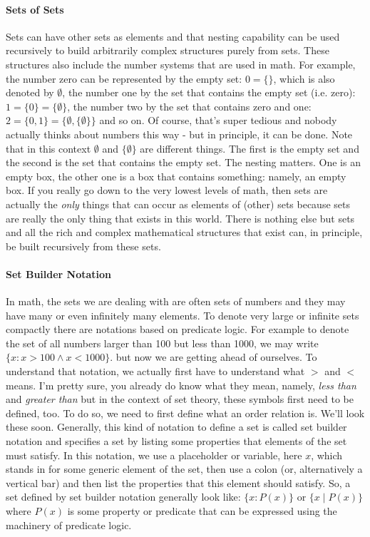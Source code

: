 \paragraph{Sets of Sets}
Sets can have other sets as elements and that nesting capability can be used recursively to build arbitrarily complex structures purely from sets. These structures also include the number systems that are used in math. For example, the number zero can be represented by the empty set: $0 = \{\}$, which is also denoted by $\emptyset$, the number one by the set that contains the empty set (i.e. zero): $1 = \{ 0 \} =  \{ \emptyset \}$, the number two by the set that contains zero and one: $2 = \{ 0, 1 \} = \{ \emptyset, \{ \emptyset \} \}$ and so on. Of course, that's super tedious and nobody actually thinks about numbers this way - but in principle, it can be done. Note that in this context $\emptyset$ and $\{ \emptyset \}$ are different things. The first is the empty set and the second is the set that contains the empty set. The nesting matters. One is an empty box, the other one is a box that contains something: namely, an empty box. If you really go down to the very lowest levels of math, then sets are actually the \emph{only} things that can occur as elements of (other) sets because sets are really the only thing that exists in this world. There is nothing else but sets and all the rich and complex mathematical structures that exist can, in principle, be built recursively from these sets. 

\paragraph{Set Builder Notation}
In math, the sets we are dealing with are often sets of numbers and they may have many or even infinitely many elements. To denote very large or infinite sets compactly there are notations based on predicate logic. For example to denote the set of all numbers larger than 100 but less than 1000, we may write $\{x : x > 100 \wedge x < 1000\}$. but now we are getting ahead of ourselves. To understand that notation, we actually first have to understand what $>$ and $<$ means. I'm pretty sure, you already do know what they mean, namely, \emph{less than} and \emph{greater than} but in the context of set theory, these symbols first need to be defined, too. To do so, we need to first define what an order relation is. We'll look these soon. Generally, this kind of notation to define a set is called set builder notation and specifies a set by listing some properties that elements of the set must satisfy. In this notation, we use a placeholder or variable, here $x$, which stands in for some generic element of the set, then use a colon (or, alternatively a vertical bar) and then list the properties that this element should satisfy. So, a set defined by set builder notation generally look like: $\{x : P(x)\}$ or  $\{x \; | \; P(x)\}$ where $P(x)$ is some property or predicate that can be expressed using the machinery of predicate logic.

